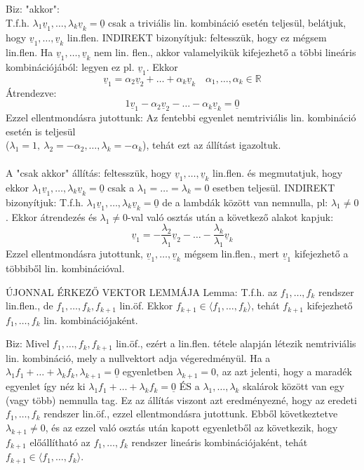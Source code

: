 \documentclass[]{article}
\newcommand{\R}{\mathbb{R}}
\newcommand{\Und}[1]{\underline{#1}}
\begin{document}
\begin{leftbar}
Biz: "akkor":\\
T.f.h. $\lambda_1\Und{v}_1,\ldots,\lambda_k\Und{v}_k = \Und{0}$ csak a triviális lin. kombináció esetén teljesül, belátjuk, hogy $\Und{v}_1,\ldots,\Und{v}_k$ lin.flen. INDIREKT bizonyítjuk: feltesszük, hogy ez mégsem lin.flen. Ha $\Und{v}_1,\ldots,\Und{v}_k$ nem lin. flen., akkor valamelyikük kifejezhető a többi lineáris kombinációjából: legyen ez pl. $\Und{v}_1$. Ekkor $$\Und{v}_1 = \alpha_2\Und{v}_2 + \ldots + \alpha_k\Und{v}_k\quad \alpha_1,\ldots,\alpha_k \in \R$$
Átrendezve: $$1\Und{v}_1-\alpha_2\Und{v}_2 - \ldots - \alpha_k\Und{v}_k = \Und{0}$$
Ezzel ellentmondásra jutottunk: Az fentebbi egyenlet nemtriviális lin. kombináció esetén is teljesül \\($\lambda_1 = 1,\: \lambda_2 = -\alpha_2,\ldots, \lambda_k = -\alpha_k$), tehát ezt az állítást igazoltuk.\\\\
A "csak akkor" állítás: feltesszük, hogy  $\Und{v}_1,\ldots,\Und{v}_k$ lin.flen. és megmutatjuk, hogy ekkor  $\lambda_1\Und{v}_1,\ldots,\lambda_k\Und{v}_k = \Und{0}$ csak a $\lambda_1 = \ldots = \lambda_k = 0$ esetben teljesül. INDIREKT bizonyítjuk: T.f.h. $\lambda_1\Und{v}_1,\ldots,\lambda_k\Und{v}_k = \Und{0}$ de a lambdák között van nemnulla, pl: $\lambda_1 \neq 0$. Ekkor átrendezés és $\lambda_1 \neq 0$-val való osztás után a következő alakot kapjuk:
$$\Und{v}_1 = -\frac{\lambda_2}{\lambda_1}\Und{v}_2-\ldots-\frac{\lambda_k}{\lambda_1}\Und{v}_k$$
Ezzel ellentmondásra jutottunk, $\Und{v}_1,\ldots,\Und{v}_k$ mégsem lin.flen., mert $\Und{v}_1$ kifejezhető a többiből lin. kombinációval.
\end{leftbar}
\begin{framed}
ÚJONNAL ÉRKEZŐ VEKTOR LEMMÁJA Lemma: T.f.h. az $f_1,\ldots,f_k$ rendszer lin.flen., de $f_1,\ldots,f_k,f_{k+1}$ lin.öf. Ekkor $f_{k+1} \in \langle f_1,\ldots,f_k \rangle$, tehát $f_{k+1}$ kifejezhető $f_1,\ldots,f_k$ lin. kombinációjaként.
\end{framed}
\begin{leftbar}
Biz: Mivel $f_1,\ldots,f_k,f_{k+1}$ lin.öf., ezért a lin.flen. tétele alapján létezik nemtriviális lin. kombináció, mely a nullvektort adja végeredményül. Ha a
$\lambda_1f_1+\ldots+\lambda_kf_k,\lambda_{k+1} = \Und{0}$  egyenletben $\lambda_{k+1} = 0$, az azt jelenti, hogy a maradék egyenlet így néz ki $\lambda_1f_1+\ldots+\lambda_kf_k = \Und{0}$ ÉS a $\lambda_1,\ldots,\lambda_k$ skalárok között van egy (vagy több) nemnulla tag. Ez az állítás viszont azt eredményezné, hogy az eredeti $f_1,\ldots,f_k$ rendszer lin.öf., ezzel ellentmondásra jutottunk. Ebből következtetve $\lambda_{k+1} \neq 0$, és az ezzel való osztás után kapott egyenletből az következik, hogy $f_{k+1}$ előállítható az $f_1,\ldots,f_k$ rendszer lineáris kombinációjaként, tehát $f_{k+1} \in \langle f_1,\ldots,f_k \rangle$.
\end{leftbar}
\end{document}
